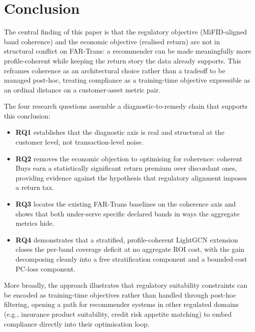 \section{Conclusion}
\label{sec:conclusion}

The central finding of this paper is that the regulatory objective (MiFID-aligned band coherence) and the economic objective (realised return) are not in structural conflict on FAR-Trans: a recommender can be made meaningfully more profile-coherent while keeping the return story the data already supports. This reframes coherence as an architectural choice rather than a tradeoff to be managed post-hoc, treating compliance as a training-time objective expressible as an ordinal distance on a customer-asset metric pair.

The four research questions assemble a diagnostic-to-remedy chain that supports this conclusion:
\begin{itemize}
    \item \textbf{RQ1} establishes that the diagnostic axis is real and structural at the customer level, not transaction-level noise.
    \item \textbf{RQ2} removes the economic objection to optimising for coherence: coherent Buys earn a statistically significant return premium over discordant ones, providing evidence against the hypothesis that regulatory alignment imposes a return tax.
    \item \textbf{RQ3} locates the existing FAR-Trans baselines on the coherence axis and shows that both under-serve specific declared bands in ways the aggregate metrics hide.
    \item \textbf{RQ4} demonstrates that a stratified, profile-coherent LightGCN extension closes the per-band coverage deficit at no aggregate ROI cost, with the gain decomposing cleanly into a free stratification component and a bounded-cost PC-loss component.
\end{itemize}

More broadly, the approach illustrates that regulatory suitability constraints can be encoded as training-time objectives rather than handled through post-hoc filtering, opening a path for recommender systems in other regulated domains (e.g., insurance product suitability, credit risk appetite matching) to embed compliance directly into their optimisation loop.

